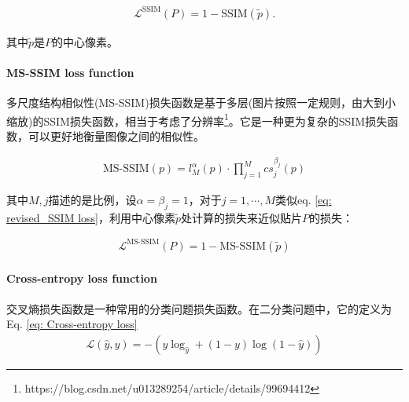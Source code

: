 \documentclass[letterpaper,12pt]{article}
\begin{document}
	\begin{equation}
		\begin{aligned}
			\mathcal{L}^{\text{SSIM}}(P)=1-\text{SSIM}(\tilde{p}).
		\end{aligned}
		\label{eq: revised_SSIM loss}
	\end{equation}
	
	其中$\tilde{p}$是$P$的中心像素。
	
	\paragraph{MS-SSIM loss function}
	
	多尺度结构相似性(MS-SSIM)损失函数是基于多层(图片按照一定规则，由大到小缩放)的SSIM损失函数，相当于考虑了分辨率\footnote{https://blog.csdn.net/u013289254/article/details/99694412}。它是一种更为复杂的SSIM损失函数，可以更好地衡量图像之间的相似性。
	
	\begin{equation}
		\begin{aligned}
			\text{MS-SSIM}(p)=l_{M}^\alpha(p)\cdot \prod_{j=1}^M cs_{j}^{\beta_j}(p)
		\end{aligned}
		\label{eq: MS-SSIM}
	\end{equation}
	
	其中$M,j$描述的是比例，设$\alpha=\beta_j=1$，对于$j={1,\cdots, M}$类似eq. \ref{eq: revised_SSIM loss}，利用中心像素$\tilde{p}$处计算的损失来近似贴片$P$的损失：
	
	\begin{equation}
		\begin{aligned}
			\mathcal{L}^{\text{MS-SSIM}}(P)=1-\text{MS-SSIM}(\tilde{p})
		\end{aligned}
		\label{eq: MS-SSIM loss}
	\end{equation}
	
	\paragraph{Cross-entropy loss function}
	
	交叉熵损失函数是一种常用的分类问题损失函数。在二分类问题中，它的定义为Eq. \ref{eq: Cross-entropy loss}
	\begin{equation}
		\begin{aligned}
			\mathcal{L}(\hat{y},y)=-\left( y\log_{\hat{y}} + (1-y) \log (1-\hat{y}) \right)
		\end{aligned}
		\label{eq: Cross-entropy loss}
	\end{equation}
	
\end{document}
